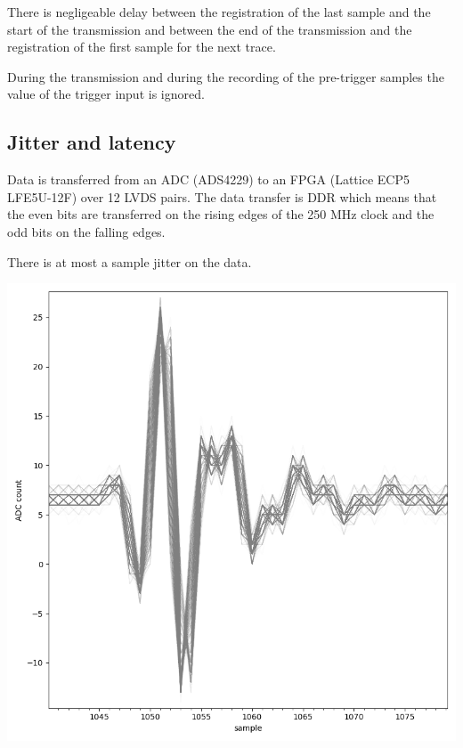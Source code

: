 \documentclass[a4paper,indent]{paper}
\begin{document}
There is negligeable delay between the registration of the last sample and the start of the transmission and between the end of the transmission and the registration of the first sample for the next trace.

During the transmission and during the recording of the pre-trigger samples the value of the trigger input is ignored.



\subsection{Jitter and latency}\label{sec:latency}
Data is transferred from an \ac{ADC} (ADS4229) to an \ac{FPGA} (Lattice ECP5 LFE5U-12F) over 12 LVDS pairs. The data transfer is \ac{DDR} which means that the even bits are transferred on the rising edges of the 250 MHz clock and the odd bits on the falling edges. 

There is at most a sample jitter on the data.

\begin{center}
  \includegraphics[width=\textwidth]{img/trigger_jitter.png}
  \label{fig:trigger_jitter}
\end{center}
\end{document}
